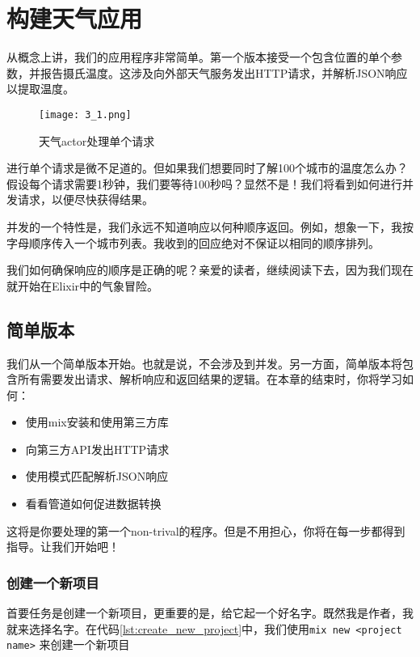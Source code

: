 \section{构建天气应用}

从概念上讲，我们的应用程序非常简单。第一个版本接受一个包含位置的单个参数，并报告摄氏温度。这涉及向外部天气服务发出HTTP请求，并解析JSON响应以提取温度。

\begin{figure}[!ht]
    \centering
    \texttt{[image: 3\_1.png]}
    \caption{天气actor处理单个请求}
    \label{fig:3_1}
\end{figure}


进行单个请求是微不足道的。但如果我们想要同时了解100个城市的温度怎么办？假设每个请求需要1秒钟，我们要等待100秒吗？显然不是！我们将看到如何进行并发请求，以便尽快获得结果。

并发的一个特性是，我们永远不知道响应以何种顺序返回。例如，想象一下，我按字母顺序传入一个城市列表。我收到的回应绝对不保证以相同的顺序排列。

我们如何确保响应的顺序是正确的呢？亲爱的读者，继续阅读下去，因为我们现在就开始在Elixir中的气象冒险。

 \subsection{简单版本}

我们从一个简单版本开始。也就是说，不会涉及到并发。另一方面，简单版本将包含所有需要发出请求、解析响应和返回结果的逻辑。在本章的结束时，你将学习如何：

\begin{itemize}

\item  使用mix安装和使用第三方库
\item  向第三方API发出HTTP请求
\item  使用模式匹配解析JSON响应
\item  看看管道如何促进数据转换
\end{itemize}

这将是你要处理的第一个non-trival的程序。但是不用担心，你将在每一步都得到指导。让我们开始吧！

\subsubsection{创建一个新项目}

首要任务是创建一个新项目，更重要的是，给它起一个好名字。既然我是作者，我就来选择名字。在代码\ref{lst:create_new_project}中，我们使用\texttt{mix new <project name>} 来创建一个新项目


